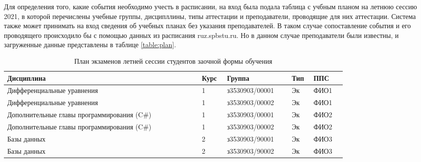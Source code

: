 Для определения того, какие события необходимо учесть в расписании, на вход была подала таблица с учбным планом на летнюю сессию 2021, в которой перечислены учебные группы, дисципллины, типы аттестации и преподаватели, проводящие для них аттестации. Система также может принимать на вход сведения об учебных планах без указания преподавателей. В таком случае сопоставление события и его проводящего происходило бы с помощью данных из расписания ruz.spbstu.ru. Но в данном случае преподаватели были известны, и загруженные данные представлены в таблице \ref{table:plan}.
\begin{table}[htbp]
		\centering\small 
	\caption{План экзаменов летней сессии студентов заочной формы обучения}%
	\begin{tabular}{|p{0.48\linewidth}|p{0.05\linewidth}|p{0.16\linewidth}|p{0.04\linewidth}|p{0.08\linewidth}|}
			\hline
			Дисциплина&Курс&Группа&Тип&ППС \\ 	\hline
		Дифференциальные уравнения                                                    & 1                                                & з3530903/00001                                     & Эк                                                         & ФИО1          \\ 	\hline
		Дифференциальные уравнения                                                    & 1                                                & з3530903/00002                                     & Эк                                                         & ФИО1          \\	\hline
		Дополнительные главы программирования (C\#)                                   & 1                                                & з3530903/00001                                     & Эк                                                         & ФИО2          \\ 	\hline
		Дополнительные главы программирования (C\#)                                   & 1                                                & з3530903/00002                                     & Эк                                                         & ФИО2          \\ 	\hline
		Базы данных                                                                   & 2                                                & з3530903/90001                                     & Эк                                                         & ФИО3          \\	\hline
		Базы данных                                                                   & 2                                                & з3530903/90002                                     & Эк                                                         & ФИО3          \\	\hline

\end{tabular}
\end{table}
